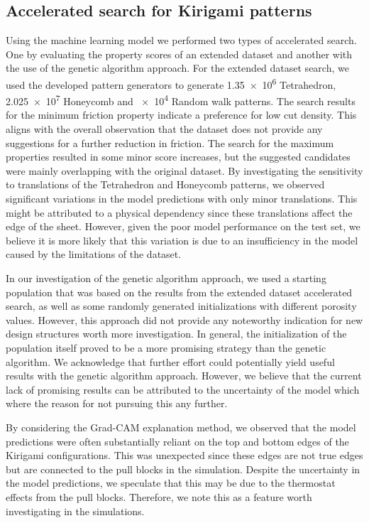 \subsection{Accelerated search for Kirigami patterns}
Using the machine learning model we performed two types of accelerated search. One
by evaluating the property scores of an extended dataset and another with the
use of the genetic algorithm approach. For the extended dataset search, we used
the developed pattern generators to generate \num{1.35e6} Tetrahedron,
\num{2.025e7} Honeycomb and \num{e4} Random walk patterns. The search results
for the minimum friction property indicate a preference for low cut density. This aligns with the overall observation that the dataset does not
provide any suggestions for a further reduction in friction. The search for the maximum properties resulted in some minor score increases, but
the suggested candidates were mainly overlapping with the original dataset. By investigating the sensitivity to translations of the Tetrahedron and Honeycomb patterns, we observed significant variations in the model predictions with only minor translations. This might be attributed to a physical dependency since these translations affect the edge of the sheet. However, given the poor model performance on the test set, we believe it is more likely that this variation is due to an insufficiency in the model caused by the limitations of the dataset.

In our investigation of the genetic algorithm approach, we used a starting population that was based on the results from the extended dataset accelerated search, as well as some randomly generated initializations with different porosity values. However, this approach did not provide any noteworthy
indication for new design structures worth more investigation. In general, the
initialization of the population itself proved to be a more promising strategy
than the genetic algorithm. We acknowledge that further effort could potentially yield useful results with the genetic algorithm approach. However, we believe that the current lack of promising results can be attributed to the uncertainty of the model which where the reason for not pursuing this any further.

By considering the Grad-CAM explanation method, we observed that the model predictions were often substantially reliant on the top and bottom edges of the Kirigami configurations. This was unexpected since these edges are not true edges but are connected to the pull blocks in the simulation. Despite the uncertainty in the model predictions, we speculate that this may be due to the thermostat effects from the pull blocks. Therefore, we note this as a feature worth investigating in the simulations.


